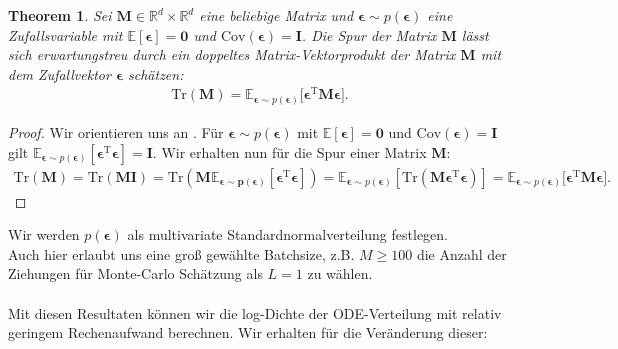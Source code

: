 \documentclass[12pt]{article}
\newcommand{\E}{\mathbb{E}}
\newtheorem{theorem}{Theorem}
\begin{document}
	\begin{theorem}%
		Sei $\mathbf{M}\in \mathbb{R}^d \times \mathbb{R}^d$ eine beliebige Matrix und $\boldsymbol\epsilon \sim p(\boldsymbol\epsilon)$ eine Zufallsvariable mit $\E[\boldsymbol\epsilon] = \mathbf{0}$ und $\mathrm{Cov}(\boldsymbol\epsilon) =\mathbf{I}$. Die Spur der Matrix $\mathbf{M}$ lässt sich erwartungstreu durch ein doppeltes Matrix-Vektorprodukt der Matrix  $\mathbf{M}$ mit dem Zufallvektor $\boldsymbol\epsilon$ schätzen:
		\begin{align*}
		\mathrm{Tr}(\mathbf{M}) =
		\E_{\boldsymbol\epsilon \sim p(\boldsymbol\epsilon)}\big[\boldsymbol\epsilon^\mathrm{T} \mathbf{M} \boldsymbol\epsilon \big].
		\end{align*}
	\end{theorem}
	\begin{proof} Wir orientieren uns an \cite{Hutchin}.
		Für $\boldsymbol\epsilon \sim p(\boldsymbol\epsilon)$ mit $\E[\boldsymbol\epsilon] = \mathbf{0}$ und $\mathrm{Cov}(\boldsymbol\epsilon) =\mathbf{I}$ gilt $\E_{\boldsymbol\epsilon\sim p(\boldsymbol\epsilon)}[\boldsymbol\epsilon^\mathrm{T}\boldsymbol\epsilon] = \mathbf{I}.$ Wir erhalten nun für die Spur einer Matrix $\mathbf{M}$:
		\begin{align*}
		\mathrm{Tr}(\mathbf{M}) = \mathrm{Tr}(\mathbf{MI}) = \mathrm{Tr}(\mathbf{M\E_{\boldsymbol\epsilon\sim p(\boldsymbol\epsilon)}[\boldsymbol\epsilon^\mathrm{T}\boldsymbol\epsilon]}) = \E_{\boldsymbol\epsilon\sim p(\boldsymbol\epsilon)}[\mathrm{Tr}(\mathbf{M}\boldsymbol\epsilon^\mathrm{T}\boldsymbol\epsilon)] =
		\E_{\boldsymbol\epsilon \sim p(\boldsymbol\epsilon)}\big[\boldsymbol\epsilon^\mathrm{T} \mathbf{M} \boldsymbol\epsilon \big].
		\end{align*}
	\end{proof}
	Wir werden $p(\boldsymbol\epsilon)$ als multivariate Standardnormalverteilung festlegen.\\
	Auch hier erlaubt uns eine groß gewählte Batchsize, z.B. $M\ge100$ die Anzahl der Ziehungen für Monte-Carlo Schätzung als $L=1$ zu wählen.\\
	\\
	Mit diesen Resultaten können wir die log-Dichte der ODE-Verteilung mit relativ geringem Rechenaufwand berechnen.
	Wir erhalten für die Veränderung dieser:
\end{document}
